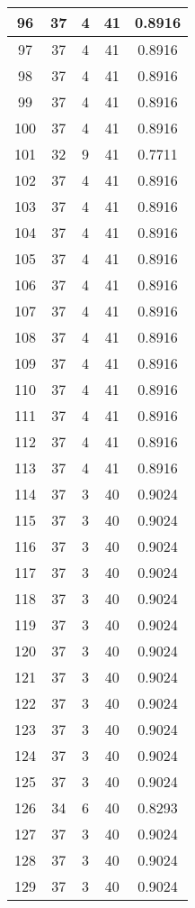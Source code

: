 \documentclass[letterpaper, 12pt]{article}
\begin{document}
\begin{longtable}{|c|c|c|c|c|}
\hline
96 & 37 & 4 & 41 & 0.8916 \\
\hline
97 & 37 & 4 & 41 & 0.8916 \\
\hline
98 & 37 & 4 & 41 & 0.8916 \\
\hline
99 & 37 & 4 & 41 & 0.8916 \\
\hline
100 & 37 & 4 & 41 & 0.8916 \\
\hline
101 & 32 & 9 & 41 & 0.7711 \\
\hline
102 & 37 & 4 & 41 & 0.8916 \\
\hline
103 & 37 & 4 & 41 & 0.8916 \\
\hline
104 & 37 & 4 & 41 & 0.8916 \\
\hline
105 & 37 & 4 & 41 & 0.8916 \\
\hline
106 & 37 & 4 & 41 & 0.8916 \\
\hline
107 & 37 & 4 & 41 & 0.8916 \\
\hline
108 & 37 & 4 & 41 & 0.8916 \\
\hline
109 & 37 & 4 & 41 & 0.8916 \\
\hline
110 & 37 & 4 & 41 & 0.8916 \\
\hline
111 & 37 & 4 & 41 & 0.8916 \\
\hline
112 & 37 & 4 & 41 & 0.8916 \\
\hline
113 & 37 & 4 & 41 & 0.8916 \\
\hline
114 & 37 & 3 & 40 & 0.9024 \\
\hline
115 & 37 & 3 & 40 & 0.9024 \\
\hline
116 & 37 & 3 & 40 & 0.9024 \\
\hline
117 & 37 & 3 & 40 & 0.9024 \\
\hline
118 & 37 & 3 & 40 & 0.9024 \\
\hline
119 & 37 & 3 & 40 & 0.9024 \\
\hline
120 & 37 & 3 & 40 & 0.9024 \\
\hline
121 & 37 & 3 & 40 & 0.9024 \\
\hline
122 & 37 & 3 & 40 & 0.9024 \\
\hline
123 & 37 & 3 & 40 & 0.9024 \\
\hline
124 & 37 & 3 & 40 & 0.9024 \\
\hline
125 & 37 & 3 & 40 & 0.9024 \\
\hline
126 & 34 & 6 & 40 & 0.8293 \\
\hline
127 & 37 & 3 & 40 & 0.9024 \\
\hline
128 & 37 & 3 & 40 & 0.9024 \\
\hline
129 & 37 & 3 & 40 & 0.9024 \\

\end{longtable}
\end{document}
